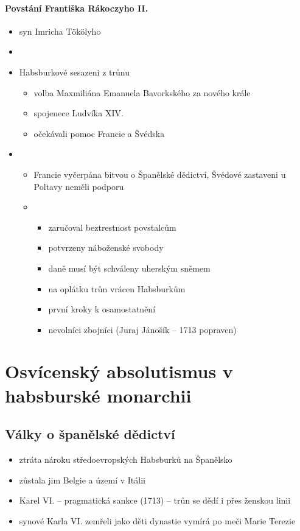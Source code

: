 \paragraph{Povstání Františka Rákoczyho II.}
\begin{itemize}
\item syn Imricha Tökölyho
\item {}
\item Habsburkové sesazeni z trůnu
	\begin{itemize}
	\item volba Maxmiliána Emanuela Bavorkského za nového krále
	\item spojenece Ludvíka XIV.
	\item očekávali pomoc Francie a Švédska
	\end{itemize}
\item {}
	\begin{itemize}
	\item Francie vyčerpána bitvou o Španělské dědictví, Švédové zastaveni u Poltavy \ra neměli podporu
	\item {}
		\begin{itemize}
		\item zaručoval beztrestnost povstalcům
		\item potvrzeny náboženské svobody
		\item daně musí být schváleny uherským sněmem
		\item na oplátku trůn vrácen Habsburkům
		\item první kroky k osamostatnění
		\item nevolníci \ra zbojníci (Juraj Jánošík -- 1713 popraven)
		\end{itemize}
	\end{itemize}
\end{itemize}

\section{Osvícenský absolutismus v habsburské monarchii}
\subsection{Války o španělské dědictví}
\begin{itemize}
\item ztráta nároku středoevropských Habsburků na Španělsko
\item zůstala jim Belgie a území v Itálii
\item Karel VI. -- pragmatická sankce (1713) -- trůn se dědí i přes ženskou linii
\item synové Karla VI. zemřeli jako děti \ra dynastie vymírá po meči \ra Marie Terezie
\end{itemize}


